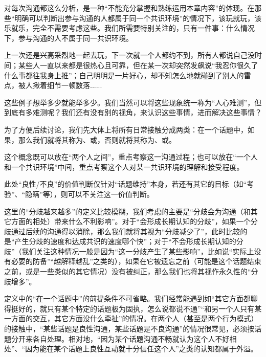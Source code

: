 对每次沟通都这么分析，是一种“不能充分掌握和熟练运用本章内容”的体现。在那些“明确可以判断出参与沟通的人都属于同一个共识环境”的情况下，该玩就玩，该乐就乐，完全不需要考虑这些。我们所需要特别关注的，只有一件事：什么情况下，参与沟通的人不属于同一共识环境。
\begin{explain}
上一次还是兴高采烈地一起去玩，下一次就一个人都约不到，所有人都说自己没时间；某些人一直以来都是很热心且可靠，但在某一次却突然发飙说“我忍你很久了什么事都往我身上推”；自己明明是一片好心，却不知怎么地就碰到了别人的雷点，被人揪着细节一顿数落......

这些例子想举多少就能举多少。我们当然可以将这些现象统一称为“人心难测”，但到底有多难测呢？我们还有没有别的视角，来认识这些事情，进而解决这些事情？
\end{explain}
为了方便后续讨论，我们先大体上将所有日常接触分成两类：在一个话题中，如果，那么我们就将其称为、或，否则就将其称为、或。
\begin{explain}
这个概念既可以放在“两个人之间”，重点考察这一沟通过程；也可以放在“一个人和一个共识环境”中间，重点考察这个人对某一共识环境的理解和接受程度。

此处“良性/不良”的价值判断仅针对“话题维持”本身，若还有其它的目标（如“考验”、“隐瞒”等），则可以不关注这一价值判断。

这里的“分歧越来越多”的定义比较模糊，我们考虑的主要是“分歧会为沟通（和其它方面的相处）带来什么不利影响”。对于“会形成长期认知的分歧”，如果一个分歧通过后续的沟通得以消除，那么我们就将其视为“分歧减少了”，此时比较的是“产生分歧的速度和达成共识的速度哪个快”；对于“不会形成长期认知的分歧”（我们关注这种情况一般是因为“这一分歧产生了某些影响”，比如说“实际上没有必要的防备”“越解释越乱”之类的），如果在它被遗忘之前（可能是这个话题结束之前，或是一些类似的其它情况）没有被纠正，那么我们也将其视作永久性的“分歧增多”。

定义中的“在一个话题中”的前提条件不可省略。我们经常能遇到如“其它方面都聊得挺好的，就只有某个特定的话题极为固执，怎么说都说不通”“和另一个人只有某一方面的交互，其它方面没什么牵扯”的情况。在两个人（甚至是两个行为模式）的接触中，“某些话题是良性沟通，某些话题是不良沟通”的情况很常见，必须按话题分开来各自处理。相对地，“因为某个话题沟通不畅就认为这个人不好相处”、“因为能在某个话题上良性互动就十分信任这个人”之类的认知都属于外溢。
\end{explain}
